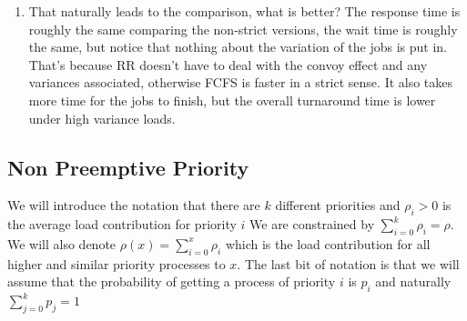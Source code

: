 \begin{enumerate}
\item That naturally leads to the comparison, what is better?
  The response time is roughly the same comparing the non-strict versions, the wait time is roughly the same, but notice that nothing about the variation of the jobs is put in.
  That's because RR doesn't have to deal with the convoy effect and any variances associated, otherwise FCFS is faster in a strict sense.
  It also takes more time for the jobs to finish, but the overall turnaround time is lower under high variance loads.
\end{enumerate}

\subsection{Non Preemptive Priority}

We will introduce the notation that there are $k$ different priorities and $\rho_i > 0$ is the average load contribution for priority $i$ We are constrained by $\sum\limits_{i=0}^k \rho_i = \rho$.
We will also denote $\rho(x) = \sum\limits_{i=0}^x \rho_i$ which is the load contribution for all higher and similar priority processes to $x$.
The last bit of notation is that we will assume that the probability of getting a process of priority $i$ is $p_i$ and naturally $\sum\limits_{j=0}^k p_j = 1$
 
